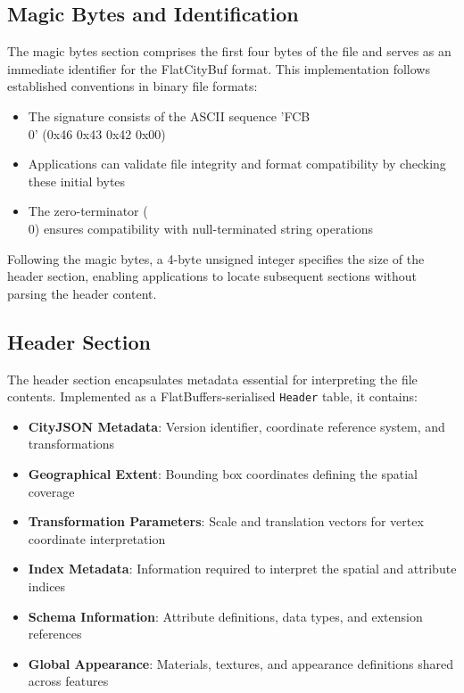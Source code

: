 \subsection{Magic Bytes and Identification}
\label{subsec:magic_bytes}

The magic bytes section comprises the first four bytes of the file and serves as an immediate identifier for the FlatCityBuf format. This implementation follows established conventions in binary file formats:

\begin{itemize}
  \item The signature consists of the ASCII sequence 'FCB\\0' (0x46 0x43 0x42 0x00)
  \item Applications can validate file integrity and format compatibility by checking these initial bytes
  \item The zero-terminator (\\0) ensures compatibility with null-terminated string operations
\end{itemize}

Following the magic bytes, a 4-byte unsigned integer specifies the size of the header section, enabling applications to locate subsequent sections without parsing the header content.

\subsection{Header Section}
\label{subsec:header_section}

The header section encapsulates metadata essential for interpreting the file contents. Implemented as a FlatBuffers-serialised \texttt{Header} table, it contains:

\begin{itemize}
  \item \textbf{CityJSON Metadata}: Version identifier, coordinate reference system, and transformations
  \item \textbf{Geographical Extent}: Bounding box coordinates defining the spatial coverage
  \item \textbf{Transformation Parameters}: Scale and translation vectors for vertex coordinate interpretation
  \item \textbf{Index Metadata}: Information required to interpret the spatial and attribute indices
  \item \textbf{Schema Information}: Attribute definitions, data types, and extension references
  \item \textbf{Global Appearance}: Materials, textures, and appearance definitions shared across features
\end{itemize}

